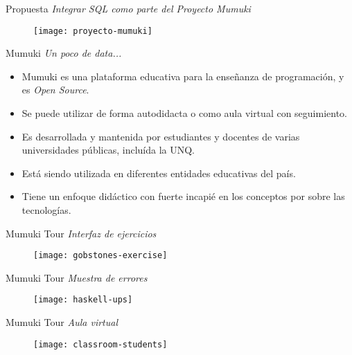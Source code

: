 \documentclass{beamer}
\begin{document}
\begin{frame}
    {Propuesta}
    {\emph{Integrar SQL como parte del Proyecto Mumuki}}

    \begin{figure}[h]
        \texttt{[image: proyecto-mumuki]}
    \end{figure}
\end{frame}


\begin{frame}
    {Mumuki}
    {\emph{Un poco de data...}}
    \begin{itemize}%
        \item Mumuki es una plataforma educativa para la enseñanza de programación, y es \textit{Open Source}.
        \item Se puede utilizar de forma autodidacta o como aula virtual con seguimiento.
        \item Es desarrollada y mantenida por estudiantes y docentes de varias universidades públicas, incluída la UNQ.
        \item Está siendo utilizada en diferentes entidades educativas del país.
        \item Tiene un enfoque didáctico con fuerte incapié en los conceptos por sobre las tecnologías.
    \end{itemize}
\end{frame}


\begin{frame}
    {Mumuki Tour}
    {\emph{Interfaz de ejercicios}}
    \begin{figure}[h]
        \texttt{[image: gobstones-exercise]}
    \end{figure}
\end{frame}

\begin{frame}
    {Mumuki Tour}
    {\emph{Muestra de errores}}

    \begin{figure}[h]
        \texttt{[image: haskell-ups]}
    \end{figure}
\end{frame}

\begin{frame}
    {Mumuki Tour}
    {\emph{Aula virtual}}

    \begin{figure}[h]
        \texttt{[image: classroom-students]}
    \end{figure}
\end{frame}
\end{document}
